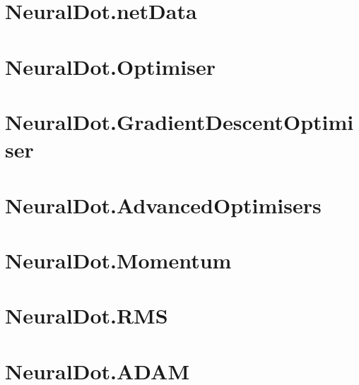 \section{NeuralDot.netData}


\section{NeuralDot.Optimiser}

\section{NeuralDot.GradientDescentOptimiser}

\section{NeuralDot.AdvancedOptimisers}

\section{NeuralDot.Momentum}

\section{NeuralDot.RMS}

\section{NeuralDot.ADAM}

